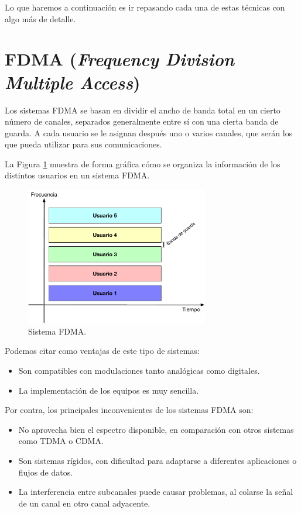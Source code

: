 \documentclass[es,apuntes]{uah}
\begin{document}
Lo que haremos a continuación es ir repasando cada una de estas técnicas con algo más de detalle. 


\section{FDMA (\textit{Frequency Division Multiple Access})}

Los sistemas FDMA se basan en dividir el ancho de banda total en un cierto número de canales, separados generalmente entre sí con una cierta banda de guarda. A cada usuario se le asignan después uno o varios canales, que serán los que pueda utilizar para sus comunicaciones. 

La Figura \ref{fig:FDMA} muestra de forma gráfica cómo se organiza la información de los distintos usuarios en un sistema FDMA. 


\begin{figure}[h!]
	\centering\includegraphics[width=8cm]{./Figuras/FDMA}
	\caption{Sistema FDMA.}
	\label{fig:FDMA}
\end{figure}
	
	
Podemos citar como ventajas de este tipo de sistemas:

\begin{itemize}
	\item Son compatibles con modulaciones tanto analógicas como digitales.
	\item La implementación de los equipos es muy sencilla.
\end{itemize}

Por contra, los principales inconvenientes de los sistemas FDMA son:

\begin{itemize}
	\item No aprovecha bien el espectro disponible, en comparación con otros sistemas como TDMA o CDMA. 
	\item Son sistemas rígidos, con dificultad para adaptarse a diferentes aplicaciones o flujos de datos. 
	\item La interferencia entre subcanales puede causar problemas, al colarse la señal de un canal en otro canal adyacente.
\end{itemize}
\end{document}
